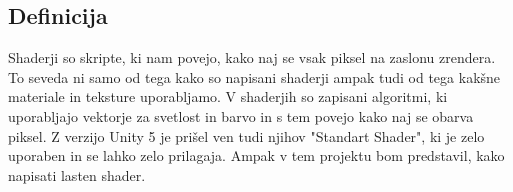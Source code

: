 {\color{indiagreen}\subsection{Definicija}}
Shaderji so skripte, ki nam povejo, kako naj se vsak piksel na zaslonu zrendera. To seveda ni samo od tega kako so napisani shaderji ampak tudi od tega kakšne materiale in teksture uporabljamo. V shaderjih so zapisani algoritmi, ki uporabljajo vektorje za svetlost in barvo in s tem povejo kako naj se obarva piksel. Z verzijo Unity 5 je prišel ven tudi njihov "Standart Shader", ki je zelo uporaben in se lahko zelo prilagaja. Ampak v tem projektu bom predstavil, kako napisati lasten shader. 